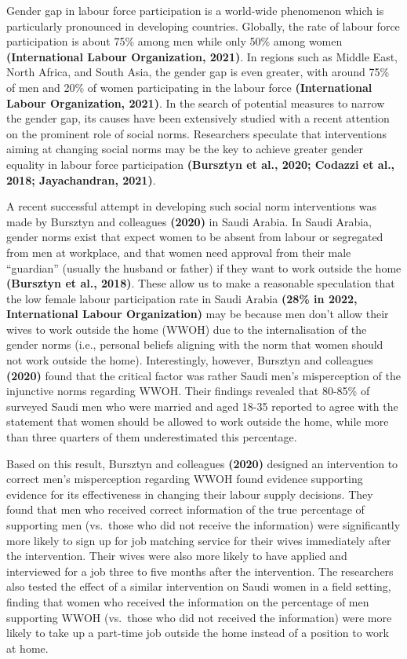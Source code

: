 \documentclass[
  11pt,
]{article}
\begin{document}
Gender gap in labour force participation is a world-wide phenomenon
which is particularly pronounced in developing countries. Globally, the
rate of labour force participation is about 75\% among men while only
50\% among women \textbf{(International Labour Organization, 2021)}. In
regions such as Middle East, North Africa, and South Asia, the gender
gap is even greater, with around 75\% of men and 20\% of women
participating in the labour force \textbf{(International Labour
Organization, 2021)}. In the search of potential measures to narrow the
gender gap, its causes have been extensively studied with a recent
attention on the prominent role of social norms. Researchers speculate
that interventions aiming at changing social norms may be the key to
achieve greater gender equality in labour force participation
\textbf{(Bursztyn et al., 2020; Codazzi et al., 2018; Jayachandran,
2021)}.

A recent successful attempt in developing such social norm interventions
was made by Bursztyn and colleagues \textbf{(2020)} in Saudi Arabia. In
Saudi Arabia, gender norms exist that expect women to be absent from
labour or segregated from men at workplace, and that women need approval
from their male ``guardian'' (usually the husband or father) if they
want to work outside the home \textbf{(Bursztyn et al., 2018)}. These
allow us to make a reasonable speculation that the low female labour
participation rate in Saudi Arabia \textbf{(28\% in 2022, International
Labour Organization)} may be because men don't allow their wives to work
outside the home (WWOH) due to the internalisation of the gender norms
(i.e., personal beliefs aligning with the norm that women should not
work outside the home). Interestingly, however, Bursztyn and colleagues
\textbf{(2020)} found that the critical factor was rather Saudi men's
misperception of the injunctive norms regarding WWOH. Their findings
revealed that 80-85\% of surveyed Saudi men who were married and aged
18-35 reported to agree with the statement that women should be allowed
to work outside the home, while more than three quarters of them
underestimated this percentage.

Based on this result, Bursztyn and colleagues \textbf{(2020)} designed
an intervention to correct men's misperception regarding WWOH found
evidence supporting evidence for its effectiveness in changing their
labour supply decisions. They found that men who received correct
information of the true percentage of supporting men (vs.~those who did
not receive the information) were significantly more likely to sign up
for job matching service for their wives immediately after the
intervention. Their wives were also more likely to have applied and
interviewed for a job three to five months after the intervention. The
researchers also tested the effect of a similar intervention on Saudi
women in a field setting, finding that women who received the
information on the percentage of men supporting WWOH (vs.~those who did
not received the information) were more likely to take up a part-time
job outside the home instead of a position to work at home.
\end{document}
